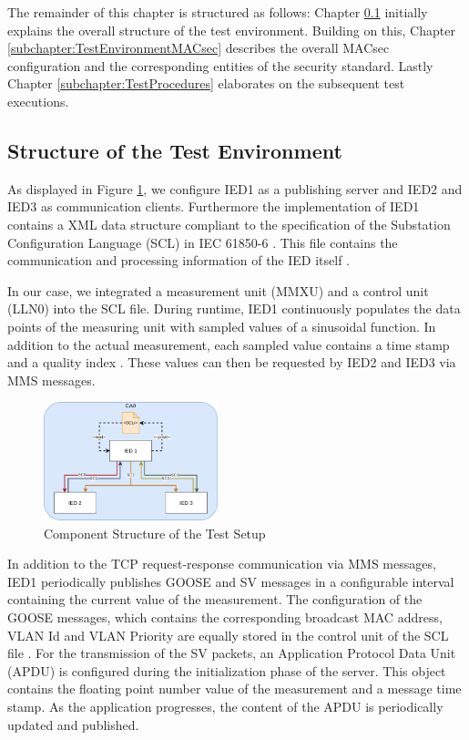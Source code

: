 \documentclass[conference, onecolumn, a4paper]{IEEEtran}
\begin{document}
\smallskip 
The remainder of this chapter is structured as follows: Chapter \ref{subchapter:TestEnvironmentStructure} initially explains the overall structure of the 
test environment. Building on this, Chapter \ref{subchapter:TestEnvironmentMACsec} describes the overall MACsec configuration and the corresponding entities 
of the security standard. Lastly Chapter \ref{subchapter:TestProcedures} elaborates on the subsequent test executions. 

\subsection{Structure of the Test Environment}
\label{subchapter:TestEnvironmentStructure}
\noindent As displayed in Figure \ref{image:MACsecTestSetup}, we configure IED1 as a publishing server and IED2 and IED3 as communication clients. 
Furthermore the implementation of IED1 contains a XML data structure compliant to the specification of the Substation Configuration Language (SCL) 
in IEC 61850-6 \cite{IEC61850-6:2010}. This file contains the communication and processing information of the IED itself \cite{IEC61850_Overview:2006}.

\smallskip
In our case, we integrated a measurement unit (MMXU) \cite[p. 268]{IEC61850-7-4:2010} and a control unit (LLN0) \cite[p. 164]{IEC61850-7-4:2010} 
into the SCL file. During runtime, IED1 continuously populates the data points of the measuring unit with sampled values of a sinusoidal function. In 
addition to the actual measurement, each sampled value contains a time stamp and a quality index \cite[p. 61ff]{IEC61850-7-3:2010}. These values can 
then be requested by IED2 and IED3 via MMS messages.

\begin{figure}[h]
    \centering
    \includegraphics[width=0.45\textwidth]{images/TestSetupIEDs.png}
    \caption{Component Structure of the Test Setup}
    \label{image:MACsecTestSetup}
\end{figure}

\noindent In addition to the TCP request-response communication via MMS messages, IED1 periodically publishes GOOSE and SV messages in a configurable 
interval containing the current value of the measurement. The configuration of the GOOSE messages, which contains the corresponding broadcast MAC address, 
VLAN Id and VLAN Priority are equally stored in the control unit of the SCL file \cite[p. 189]{IEC61850-8-1:2011}. For the transmission of the SV 
packets, an Application Protocol Data Unit (APDU) is configured during the initialization phase of the server. This object contains the floating point 
number value of the measurement and a message time stamp. As the application progresses, the content of the APDU is periodically updated and published. 
\end{document}
